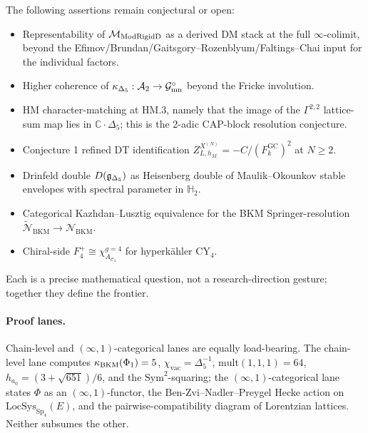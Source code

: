 The following assertions remain conjectural or open:
\begin{itemize}
\item Representability of $\mathcal{M}_{\mathrm{ModRigidD}}$ as a derived DM stack at the full $\infty$-colimit, beyond the Efimov/Brundan/Gaitsgory--Rozenblyum/Faltings--Chai input for the individual factors.
\item Higher coherence of $\kappa_{\Delta_5}: \mathcal{A}_2 \to \mathcal{G}_{\mathrm{mn}}^\circ$ beyond the Fricke involution.
\item HM character-matching at HM.3, namely that the image of the $\Gamma^{2,2}$ lattice-sum map lies in $\mathbb{C}\cdot\Delta_5$; this is the 2-adic CAP-block resolution conjecture.
\item Conjecture 1 refined DT identification $Z^{X^{(N)}}_{L, h_M} = -C/(F^{\mathrm{GC}}_k)^2$ at $N \geq 2$.
\item Drinfeld double $D(\mathfrak{g}_{\Delta_5})$ as Heisenberg double of Maulik--Okounkov stable envelopes with spectral parameter in $\mathbb{H}_2$.
\item Categorical Kazhdan--Lusztig equivalence for the BKM Springer-resolution $\widetilde{\mathcal{N}}_{\mathrm{BKM}} \to \mathcal{N}_{\mathrm{BKM}}$.
\item Chiral-side $F_4^+ \cong \chi^{g=4}_{A_{\mathcal{C}_4}}$ for hyperk\"ahler CY$_4$.
\end{itemize}
Each is a precise mathematical question, not a research-direction gesture;
together they define the frontier.

\paragraph{Proof lanes.} Chain-level and $(\infty,1)$-categorical lanes are
equally load-bearing.  The chain-level lane computes $\kappa_{\mathrm{BKM}}(\Phi_1) = 5$,
$\chi_{\mathrm{vac}} = \Delta_5^{-1}$, $\mathrm{mult}(1,1,1) = 64$, $h_{a_0} = (3+\sqrt{651})/6$,
and the $\mathrm{Sym}^2$-squaring; the $(\infty,1)$-categorical lane states
$\Phi$ as an $(\infty,1)$-functor, the Ben-Zvi--Nadler--Preygel Hecke
action on $\mathrm{LocSys}_{\mathrm{Sp}_4}(E)$, and the pairwise-compatibility
diagram of Lorentzian lattices. Neither subsumes the other.
